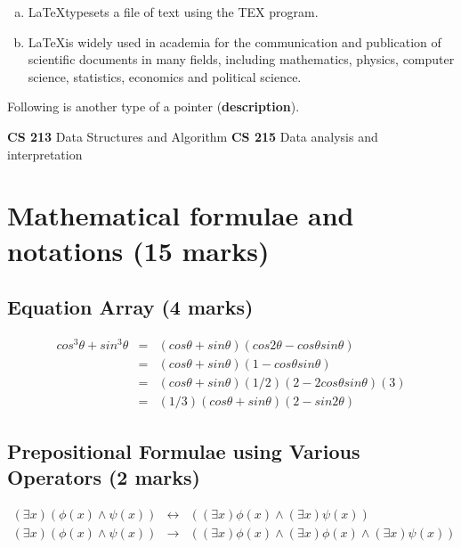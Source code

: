 \documentclass[12pt]{article}
\newcommand{\LATEX}{\LaTeX}
\newcommand{\comment}[1]{}
\begin{document}
\begin{enumerate}[(a)]
\item \LATEX typesets a file of text using the TEX program.
\item \LATEX is widely used in academia for the communication and publication
of scientific documents in many fields, including mathematics, physics,
computer science, statistics, economics and political science.
\end{enumerate}

Following is another type of a pointer (\textbf{description}).


\textbf{CS 213} Data Structures and Algorithm
\textbf{CS 215} Data analysis and interpretation
\newpage

\section{Mathematical formulae and notations (15 marks)}

\subsection{Equation Array (4 marks)}

\begin{eqnarray} \label{eq1}
cos^3\theta + sin^3\theta & = & (cos\theta + sin\theta)(cos2\theta - cos\theta sin\theta) \\
& = & (cos\theta + sin\theta)(1 - cos\theta sin\theta) \\
& = & (cos\theta + sin\theta)(1/2)(2 - 2cos\theta sin\theta)(3) \\
& = & (1/3)(cos\theta + sin\theta)(2-sin2\theta)
\end{eqnarray}

\subsection{Prepositional Formulae using Various Operators (2 marks)}
\begin{eqnarray*}
(\exists x) (\phi(x)\wedge\psi(x)) & \longleftrightarrow & ((\exists x) \phi(x) \wedge (\exists x) \psi(x)) \\
(\exists x)  (\phi(x) \wedge \psi(x)) & \longrightarrow & ((\exists x) \phi(x) \wedge (\exists x) \phi(x) \wedge (\exists x) \psi(x))
\end{eqnarray*}

\comment{
\begin{eqnarray*}
$cos^3θ + sin3
θ = (cosθ + sinθ)(cos2θ − cosθsinθ) (1)
= (cosθ + sinθ)(1 − cosθsinθ) (2)
= (cosθ + sinθ)(1/2)(2 − 2cosθsinθ)(3) (3)
= (1/2)(cosθ + sinθ)(2 − sin(2θ)) (4)$
}
\end{document}
